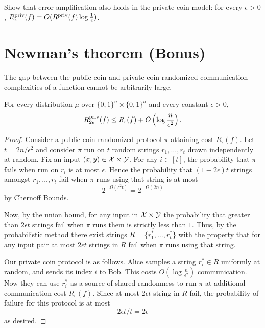 \begin{exercise}
Show that error amplification also holds in the private coin model: for every $\epsilon > 0$, $R^{\mathrm{priv}}_\epsilon(f) = O(R^{\mathrm{priv}}(f) \log \frac1\epsilon)$.
\end{exercise}


\newpage 
\section{Newman's theorem (Bonus)}

The gap between the public-coin and private-coin randomized communication complexities of a function cannot be arbitrarily large. 

\begin{theorem}
For every distribution $\mu$ over $\{0,1\}^n \times \{0,1\}^n$ and every constant $\epsilon > 0$,
\[
R^{\mathrm{priv}}_{2\epsilon}(f) \le R_\epsilon(f) + O\left(\log \frac{n}{\epsilon^2}\right).
\]
\end{theorem}

\begin{proof}
Consider a public-coin randomized protocol $\pi$ attaining cost $R_\epsilon(f)$. Let $t = 2n/\epsilon^2$ and consider $\pi$ run on $t$ random strings $r_1, \dots, r_t$ drawn independently at random. Fix an input $(x,y) \in \mathcal{X} \times \mathcal{Y}$. For any $i \in [t]$, the probability that $\pi$ fails when run on $r_i$ is at most $\epsilon$.
Hence the probability that $(1-2\epsilon)t$ strings amongst $r_1, \dots, r_t$ fail when $\pi$ runs using that string is at most
$$2^{-\Omega(\epsilon^2t)} = 2^{-\Omega(2n)}$$
by Chernoff Bounds. 

Now, by the union bound, for any input in $\mathcal{X}\times \mathcal{Y}$ the probability that greater than $2\epsilon t$ strings fail when $\pi$ runs them is strictly less than $1$. Thus, by the probabilistic method there exist strings $R = \{r_1^*, \dots, r_t^*\}$ with the property that for any input pair at most $2\epsilon t$ strings in $R$ fail when $\pi$ runs using that string.

Our private coin protocol is as follows. Alice samples a string $r_i^* \in R$ uniformly at random, and sends its index $i$ to Bob. This costs $O(\log\frac{n}{\epsilon^2})$ communication. Now they can use $r_i^*$ as a source of shared randomness to run $\pi$ at additional communication cost $R_\epsilon(f)$. Since at most $2\epsilon t$ string in $R$ fail, the probability of failure for this protocol is at most
$$2\epsilon t/t = 2\epsilon$$
as desired.
\end{proof}

